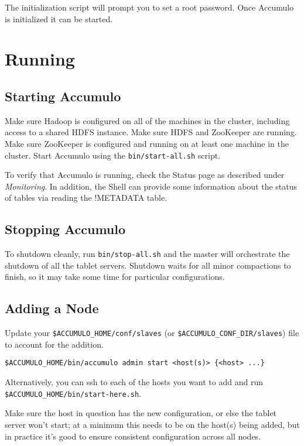 The initialization script will prompt you to set a root password. Once Accumulo is
initialized it can be started.

\section{Running}

\subsection{Starting Accumulo}

Make sure Hadoop is configured on all of the machines in the cluster, including
access to a shared HDFS instance. Make sure HDFS and ZooKeeper are running.
Make sure ZooKeeper is configured and running on at least one machine in the
cluster.
Start Accumulo using the \texttt{bin/start-all.sh} script.

To verify that Accumulo is running, check the Status page as described under
\emph{Monitoring}. In addition, the Shell can provide some information about the status of
tables via reading the !METADATA table.

\subsection{Stopping Accumulo}

To shutdown cleanly, run \texttt{bin/stop-all.sh} and the master will orchestrate the
shutdown of all the tablet servers. Shutdown waits for all minor compactions to finish, so it may
take some time for particular configurations.

\subsection{Adding a Node}

Update your \texttt{\$ACCUMULO_HOME/conf/slaves} (or \texttt{\$ACCUMULO_CONF_DIR/slaves}) file to account for the addition.

\begin{verbatim}
$ACCUMULO_HOME/bin/accumulo admin start <host(s)> {<host> ...}
\end{verbatim}

Alternatively, you can ssh to each of the hosts you want to add and run 
\texttt{\$ACCUMULO_HOME/bin/start-here.sh}.

Make sure the host in question has the new configuration, or else the tablet 
server won't start; at a minimum this needs to be on the host(s) being added, 
but in practice it's good to ensure consistent configuration across all nodes.


